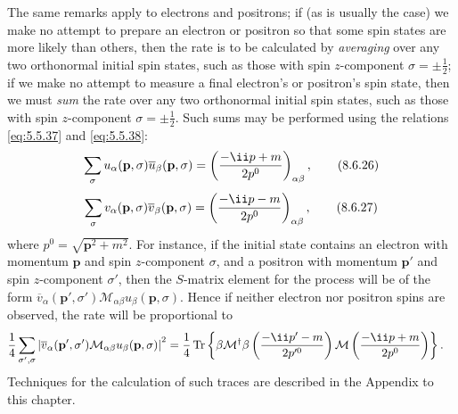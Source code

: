 The same remarks apply to electrons and positrons; if (as is usually the case)
we make no attempt to prepare an electron or positron so that some spin states
are more likely than others, then the rate is to be calculated by
\emph{averaging} over any two orthonormal initial spin states, such as those
with spin $z$-component $\sigma=\mathord\pm\frac12$; if we make no attempt to
measure a final electron's or positron's spin state, then we must \emph{sum}
the rate over any two orthonormal initial spin states, such as those with spin
$z$-component $\sigma=\mathord\pm\frac12$. Such sums may be performed using
the relations \eqref{eq:5.5.37} and \eqref{eq:5.5.38}:
\begin{equation}
\sum_\sigma u_\alpha(\mathbf p,\sigma)\overline u_\beta(\mathbf p,\sigma)
=\left(\frac{-\ii\sl{p}+m}{2p^0}\right)_{\alpha\beta},
\tag{8.6.26}\label{eq:8.6.26}
\end{equation}
\begin{equation}
\sum_\sigma v_\alpha(\mathbf p,\sigma)\overline v_\beta(\mathbf p,\sigma)
=\left(\frac{-\ii\sl{p}-m}{2p^0}\right)_{\alpha\beta},
\tag{8.6.27}\label{eq:8.6.27}
\end{equation}
where $p^0=\sqrt{\mathbf p^2+m^2}$. For instance, if the initial state
contains an electron with momentum $\mathbf p$ and spin $z$-component
$\sigma$, and a positron with momentum $\mathbf p'$ and spin $z$-component
$\sigma'$, then the $S$-matrix element for the process will be of the form
$\overline v_\alpha(\mathbf p',\sigma')\mathcal M_{\alpha\beta}
u_\beta(\mathbf p,\sigma)$. Hence if neither electron nor positron spins are
observed, the rate will be proportional to
\begin{align*}
&\frac14\sum_{\sigma',\sigma}
\left\lvert\overline v_\alpha(\mathbf p',\sigma')
\mathcal M_{\alpha\beta}u_\beta(\mathbf p,\sigma)\right\rvert^2
=
\frac14\operatorname{Tr}\left\{
\beta\mathcal M^\dagger\beta
\left(\frac{-\ii\sl{p'}-m}{2p'^0}\right)
\mathcal M
\left(\frac{-\ii\sl{p}+m}{2p^0}\right)
\right\}.
\end{align*}
Techniques for the calculation of such traces are described in the Appendix to
this chapter.
